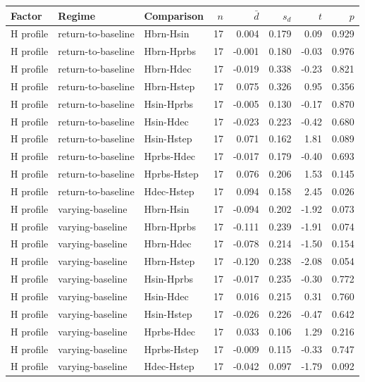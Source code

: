 \begin{tabular}{lllrrrrr}
\toprule
Factor & Regime & Comparison & \(n\) & \(\bar{d}\) & \(s_d\) & \(t\) & \(p\) \\
\midrule
H profile & return-to-baseline & Hbrn-Hsin & 17 & 0.004 & 0.179 & 0.09 & 0.929 \\
H profile & return-to-baseline & Hbrn-Hprbs & 17 & -0.001 & 0.180 & -0.03 & 0.976 \\
H profile & return-to-baseline & Hbrn-Hdec & 17 & -0.019 & 0.338 & -0.23 & 0.821 \\
H profile & return-to-baseline & Hbrn-Hstep & 17 & 0.075 & 0.326 & 0.95 & 0.356 \\
H profile & return-to-baseline & Hsin-Hprbs & 17 & -0.005 & 0.130 & -0.17 & 0.870 \\
H profile & return-to-baseline & Hsin-Hdec & 17 & -0.023 & 0.223 & -0.42 & 0.680 \\
H profile & return-to-baseline & Hsin-Hstep & 17 & 0.071 & 0.162 & 1.81 & 0.089 \\
H profile & return-to-baseline & Hprbs-Hdec & 17 & -0.017 & 0.179 & -0.40 & 0.693 \\
H profile & return-to-baseline & Hprbs-Hstep & 17 & 0.076 & 0.206 & 1.53 & 0.145 \\
H profile & return-to-baseline & Hdec-Hstep & 17 & 0.094 & 0.158 & 2.45 & 0.026 \\
H profile & varying-baseline & Hbrn-Hsin & 17 & -0.094 & 0.202 & -1.92 & 0.073 \\
H profile & varying-baseline & Hbrn-Hprbs & 17 & -0.111 & 0.239 & -1.91 & 0.074 \\
H profile & varying-baseline & Hbrn-Hdec & 17 & -0.078 & 0.214 & -1.50 & 0.154 \\
H profile & varying-baseline & Hbrn-Hstep & 17 & -0.120 & 0.238 & -2.08 & 0.054 \\
H profile & varying-baseline & Hsin-Hprbs & 17 & -0.017 & 0.235 & -0.30 & 0.772 \\
H profile & varying-baseline & Hsin-Hdec & 17 & 0.016 & 0.215 & 0.31 & 0.760 \\
H profile & varying-baseline & Hsin-Hstep & 17 & -0.026 & 0.226 & -0.47 & 0.642 \\
H profile & varying-baseline & Hprbs-Hdec & 17 & 0.033 & 0.106 & 1.29 & 0.216 \\
H profile & varying-baseline & Hprbs-Hstep & 17 & -0.009 & 0.115 & -0.33 & 0.747 \\
H profile & varying-baseline & Hdec-Hstep & 17 & -0.042 & 0.097 & -1.79 & 0.092 \\

\end{tabular}
